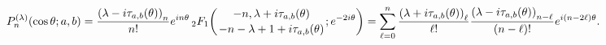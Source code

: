 \[\mathop{P^{(\lambda)}_{n}\/}\nolimits\!\left(\mathop{\cos\/}\nolimits\theta;a,%
b\right)=\frac{\left(\lambda-i\tau_{a,b}(\theta)\right)_{n}}{n!}e^{in\theta}\*%
\mathop{{{}_{2}F_{1}}\/}\nolimits\!\left({-n,\lambda+i\tau_{a,b}(\theta)\atop-%
n-\lambda+1+i\tau_{a,b}(\theta)};e^{-2i\theta}\right)=\sum_{\ell=0}^{n}\frac{%
\left(\lambda+i\tau_{a,b}(\theta)\right)_{\ell}}{\ell!}\frac{\left(\lambda-i%
\tau_{a,b}(\theta)\right)_{n-\ell}}{(n-\ell)!}e^{i(n-2\ell)\theta}.\]